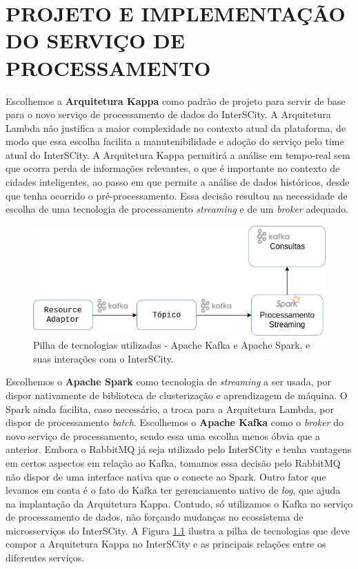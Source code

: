 \chapter[PROJETO E IMPLEMENTAÇÃO DO SERVIÇO DE PROCESSAMENTO]{PROJETO E IMPLEMENTAÇÃO DO SERVIÇO DE PROCESSAMENTO}

\label{chapter:architecture}

Escolhemos a \textbf{Arquitetura Kappa} como padrão de projeto para servir
de base para o novo serviço de processamento de dados do InterSCity.
A Arquitetura Lambda não justifica a maior complexidade no contexto atual da
plataforma, de modo que essa escolha facilita a manutenibilidade e adoção do
serviço pelo time atual do InterSCity. A Arquitetura Kappa permitirá a análise
em tempo-real sem que ocorra perda de informações relevantes, o que é
importante no contexto de cidades inteligentes, ao passo em que permite a
análise de dados históricos, desde que tenha ocorrido o pré-processamento.
Essa decisão resultou na necessidade de escolha de uma tecnologia de
processamento \textit{streaming} e de um \textit{broker} adequado.

\begin{figure}[hbt]
  \centering
    \includegraphics[scale=0.5]{figuras/kappa_tools2.png}
  \caption{Pilha de tecnologias utilizadas - Apache Kafka e Apache Spark, e suas
    interações com o InterSCity.}
  \label{fig:stack}
\end{figure}


Escolhemos o \textbf{Apache Spark} como tecnologia de \textit{streaming}
a ser usada, por dispor nativamente de biblioteca de clusterização
e aprendizagem de máquina. O Spark ainda facilita, caso necessário, a
troca para a Arquitetura Lambda, por dispor de processamento \textit{batch}.
Escolhemos o \textbf{Apache Kafka} como o \textit{broker} do novo serviço de
processamento, sendo essa uma escolha menos óbvia que a anterior. Embora o
RabbitMQ já seja utilizado pelo InterSCity e tenha vantagens em certos aspectos
em relação ao Kafka, tomamos essa decisão pelo RabbitMQ não dispor de uma
interface nativa que o conecte ao Spark. Outro fator que levamos em conta é o
fato do Kafka ter gerenciamento nativo de \textit{log}, que ajuda na
implantação da Arquitetura Kappa. Contudo, só utilizamos o Kafka no serviço
de processamento de dados, não forçando mudanças no ecossistema de
microsserviços do InterSCity. A Figura \ref{fig:stack} ilustra a pilha de
tecnologias que deve compor a Arquitetura Kappa no InterSCity e as principais
relações entre os diferentes serviços.

